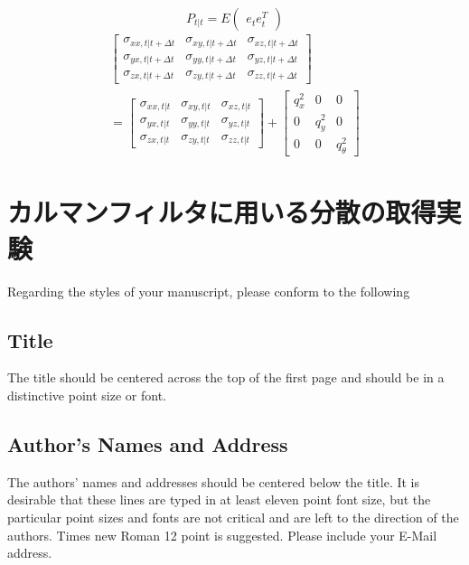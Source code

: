 \documentclass[a4paper]{article}
\begin{document}
\begin{equation}
    P_{t|t} = E
    \begin{pmatrix}
        e_{t} e_{t}^{T}
    \end{pmatrix}
    \label{eq:4}
\end{equation}
%
%
\begin{equation}
    \begin{split}
    \begin{bmatrix}
    \sigma_{xx,t|t+\Delta t} &\sigma_{xy,t|t+\Delta t} &\sigma_{xz,t|t+\Delta t} \\
    \sigma_{yx,t|t+\Delta t} &\sigma_{yy,t|t+\Delta t} &\sigma_{yz,t|t+\Delta t} \\
    \sigma_{zx,t|t+\Delta t} &\sigma_{zy,t|t+\Delta t} &\sigma_{zz,t|t+\Delta t} 
    \end{bmatrix} \\
    = 
    \begin{bmatrix}
        \sigma_{xx,t|t} &\sigma_{xy,t|t} &\sigma_{xz,t|t} \\
        \sigma_{yx,t|t} &\sigma_{yy,t|t} &\sigma_{yz,t|t} \\
        \sigma_{zx,t|t} &\sigma_{zy,t|t} &\sigma_{zz,t|t}
    \end{bmatrix} 
    +
    \begin{bmatrix}
        q_{x}^{2} &0         &0 \\
        0         &q_{y}^{2} &0 \\
        0         &0         &q_{\theta}^{2}
    \end{bmatrix}
\end{split}
    \label{eq:4} 
\end{equation}


\section{カルマンフィルタに用いる分散の取得実験}

Regarding the styles of your manuscript, please conform to the following 

\subsection{Title}
The title should be centered across the top of the first page and should 
be in a distinctive point size or font.

\subsection{Author's Names and Address}
The authors' names and addresses should be centered below the title.
It is desirable that these lines are typed in at least eleven point font size,
but the particular point sizes and fonts are not critical and are left to the
direction of the authors.
Times new Roman 12 point is suggested.
Please include your E-Mail address. 
\end{document}
